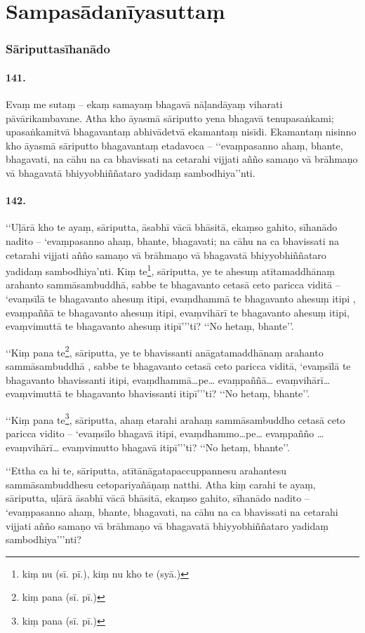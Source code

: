 \section{Sampasādanīyasuttaṃ}

\subsubsection{Sāriputtasīhanādo}

\paragraph{141.} Evaṃ me sutaṃ – ekaṃ samayaṃ bhagavā nāḷandāyaṃ viharati pāvārikambavane. Atha kho āyasmā sāriputto yena bhagavā tenupasaṅkami; upasaṅkamitvā bhagavantaṃ abhivādetvā ekamantaṃ nisīdi. Ekamantaṃ nisinno kho āyasmā sāriputto bhagavantaṃ etadavoca – ‘‘evaṃpasanno ahaṃ, bhante, bhagavati, na cāhu na ca bhavissati na cetarahi vijjati añño samaṇo vā brāhmaṇo vā bhagavatā bhiyyobhiññataro yadidaṃ sambodhiya’’nti.

\paragraph{142.} ‘‘Uḷārā kho te ayaṃ, sāriputta, āsabhī vācā bhāsitā, ekaṃso gahito, sīhanādo nadito – ‘evaṃpasanno ahaṃ, bhante, bhagavati; na cāhu na ca bhavissati na cetarahi vijjati añño samaṇo vā brāhmaṇo vā bhagavatā bhiyyobhiññataro yadidaṃ sambodhiya’nti. Kiṃ te\footnote{kiṃ nu (sī. pī.), kiṃ nu kho te (syā.)}, sāriputta, ye te ahesuṃ atītamaddhānaṃ arahanto sammāsambuddhā, sabbe te bhagavanto cetasā ceto paricca viditā – ‘evaṃsīlā te bhagavanto ahesuṃ itipi, evaṃdhammā te bhagavanto ahesuṃ itipi , evaṃpaññā te bhagavanto ahesuṃ itipi, evaṃvihārī te bhagavanto ahesuṃ itipi, evaṃvimuttā te bhagavanto ahesuṃ itipī’’’ti? ‘‘No hetaṃ, bhante’’.

‘‘Kiṃ pana te\footnote{kiṃ pana (sī. pī.)}, sāriputta, ye te bhavissanti anāgatamaddhānaṃ arahanto sammāsambuddhā , sabbe te bhagavanto cetasā ceto paricca viditā, `evaṃsīlā te bhagavanto bhavissanti itipi, evaṃdhammā…pe… evaṃpaññā… evaṃvihārī… evaṃvimuttā te bhagavanto bhavissanti itipī’’’ti? ‘‘No hetaṃ, bhante’’.

‘‘Kiṃ pana te\footnote{kiṃ pana (sī. pī.)}, sāriputta, ahaṃ etarahi arahaṃ sammāsambuddho cetasā ceto paricca vidito – ‘evaṃsīlo bhagavā itipi, evaṃdhammo…pe… evaṃpañño … evaṃvihārī… evaṃvimutto bhagavā itipī’’’ti? ‘‘No hetaṃ, bhante’’.

‘‘Ettha ca hi te, sāriputta, atītānāgatapaccuppannesu arahantesu sammāsambuddhesu cetopariyañāṇaṃ natthi. Atha kiṃ carahi te ayaṃ, sāriputta, uḷārā āsabhī vācā bhāsitā, ekaṃso gahito, sīhanādo nadito – ‘evaṃpasanno ahaṃ, bhante, bhagavati, na cāhu na ca bhavissati na cetarahi vijjati añño samaṇo vā brāhmaṇo vā bhagavatā bhiyyobhiññataro yadidaṃ sambodhiya’’’nti?

